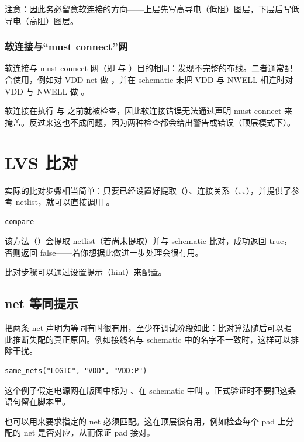 注意：因此务必留意软连接的方向——上层先写高导电（低阻）图层，下层后写低导电（高阻）图层。

\subsubsection{软连接与“must connect”网}

软连接与 must connect 网（即  与 ）目的相同：发现不完整的布线。二者通常配合使用，例如对 VDD net 做 ，并在 schematic 未把 VDD 与 NWELL 相连时对 VDD 与 NWELL 做 。

软连接在执行  与  之前就被检查，因此软连接错误无法通过声明 must connect 来掩盖。反过来这也不成问题，因为两种检查都会给出警告或错误（顶层模式下）。

\section{LVS 比对}\label{sec:lvs_compare}

实际的比对步骤相当简单：只要已经设置好提取（）、连接关系（、、），并提供了参考 netlist，就可以直接调用 。

\begin{lstlisting}
compare
\end{lstlisting}

该方法（）会提取 netlist（若尚未提取）并与 schematic 比对，成功返回 true，否则返回 false——若你想据此做进一步处理会很有用。

比对步骤可以通过设置提示（hint）来配置。

\subsection{net 等同提示}

把两条 net 声明为等同有时很有用，至少在调试阶段如此：比对算法随后可以据此推断失配的真正原因。例如接线名与 schematic 中的名字不一致时，这样可以排除干扰。

\begin{lstlisting}
same_nets("LOGIC", "VDD", "VDD:P")
\end{lstlisting}

这个例子假定电源网在版图中标为 、在 schematic 中叫 。正式验证时不要把这条语句留在脚本里。

 也可以用来要求指定的 net 必须匹配。这在顶层很有用，例如检查每个 pad 上分配的 net 是否对应，从而保证 pad 接对。

